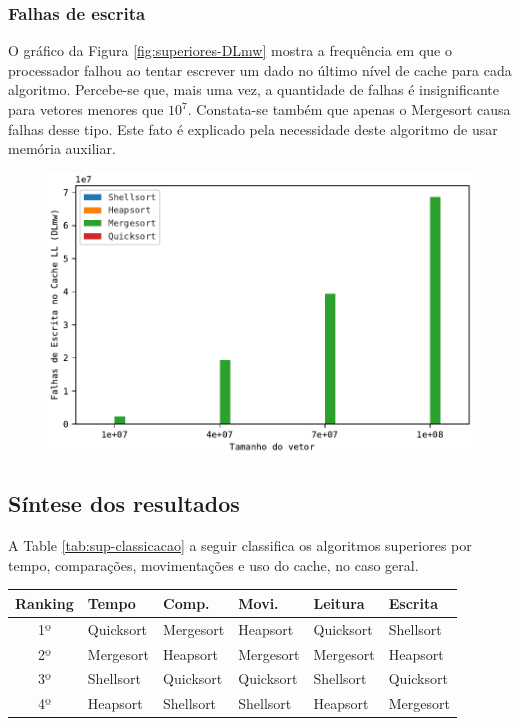 \subsubsection{Falhas de escrita}
O gráfico da Figura \ref{fig:superiores-DLmw} mostra a frequência em que o processador falhou ao tentar escrever um dado no último nível de cache para cada algoritmo. Percebe-se que, mais uma vez, a quantidade de falhas é insignificante para vetores menores que $10^7$. Constata-se também que apenas o Mergesort causa falhas desse tipo. Este fato é explicado pela necessidade deste algoritmo de usar memória auxiliar.

\begin{figure}[H]
\centering
\includegraphics[scale=0.787]{figuras/pdf/superiores_DLmw.pdf}
\end{figure}

\subsection{Síntese dos resultados}
A Table \ref{tab:sup-classicacao} a seguir classifica os algoritmos superiores por tempo, comparações, movimentações e uso do cache, no caso geral.

\begin{table}[H]
    \centering
    \begin{tabular}{ | c | l | l | l | l | l | }
        \hline
        Ranking & Tempo     & Comp.     & Movi.     & Leitura   & Escrita   \\
        \hline
        1º      & Quicksort & Mergesort & Heapsort  & Quicksort & Shellsort \\
        2º      & Mergesort & Heapsort  & Mergesort & Mergesort & Heapsort  \\
        3º      & Shellsort & Quicksort & Quicksort & Shellsort & Quicksort \\
        4º      & Heapsort  & Shellsort & Shellsort & Heapsort  & Mergesort \\
        \hline
    \end{tabular}
\end{table}

